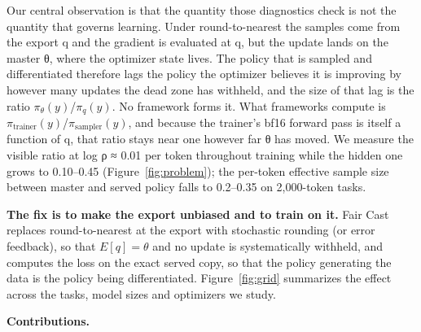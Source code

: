 \documentclass[
  10pt,
]{article}
\begin{document}
Our central observation is that the quantity those diagnostics check is not the quantity that
governs learning. Under round-to-nearest the samples come from the export q and the gradient is
evaluated at q, but the update lands on the master θ, where the optimizer state lives. The policy
that is sampled and differentiated therefore lags the policy the optimizer believes it is improving
by however many updates the dead zone has withheld, and the size of that lag is the ratio
\(\pi_\theta(y)\)/\(\pi_q(y)\). No framework forms it. What frameworks compute is
\(\pi_{\mathrm{trainer}}(y)\)/\(\pi_{\mathrm{sampler}}(y)\), and because the trainer's bf16 forward
pass is itself a function of q, that ratio stays near one however far θ has moved. We measure the
visible ratio at \textbar log ρ\textbar{} ≈ 0.01 per token throughout training while the hidden one
grows to 0.10--0.45 (Figure~\ref{fig:problem}); the per-token effective sample size between master and served policy
falls to 0.2--0.35 on 2,000-token tasks.

\textbf{The fix is to make the export unbiased and to train on it.} Fair Cast replaces
round-to-nearest at the export with stochastic rounding (or error feedback), so that
\(E[q] = \theta\) and no update is systematically withheld, and computes the loss on the exact
served copy, so that the policy generating the data is the policy being differentiated. Figure~\ref{fig:grid}
summarizes the effect across the tasks, model sizes and optimizers we study.

\textbf{Contributions.}
\end{document}
